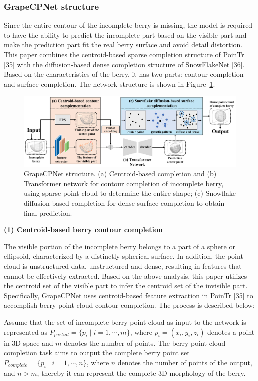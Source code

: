 \documentclass[12pt]{article}
\begin{document}
\subsubsection{GrapeCPNet structure}

Since the entire contour of the incomplete berry is missing, the model is required to have the ability to predict the incomplete part based on the visible part and make the prediction part fit the real berry surface and avoid detail distortion. 
This paper combines the centroid-based sparse completion structure of PoinTr [35] with the diffusion-based dense completion structure of SnowFlakeNet [36]. 
Based on the characteristics of the berry, it has two parts: contour completion and surface completion. The network structure is shown in Figure~\ref{fig:raw5}.

\begin{figure}[hbt!]
    \centering
    \includegraphics[width=1\textwidth]{figures/Figure10.pdf}
    \caption{GrapeCPNet structure. (a) Centroid-based completion and (b) Transformer network for contour completion of incomplete berry, using sparse point cloud to determine the entire shape; (c) Snowflake diffusion-based completion for dense surface completion to obtain final prediction.}
    \label{fig:raw5}
\end{figure}

{\raggedright\textbf{(1) Centroid-based berry contour completion}}

The visible portion of the incomplete berry belongs to a part of a sphere or ellipsoid, characterized by a distinctly spherical surface. 
In addition, the point cloud is unstructured data, unstructured and dense, resulting in features that cannot be effectively extracted. 
Based on the above analysis, this paper utilizes the centroid set of the visible part to infer the centroid set of the invisible part. 
Specifically, GrapeCPNet uses centroid-based feature extraction in PoinTr [35] to accomplish berry point cloud contour completion. The process is described below: 

Assume that the set of incomplete berry point cloud as input to the network is represented as $P_{partial}=\{p_i \mid i=1, \cdots, m \}$, where $p_i=(x_i,y_i,z_i)$ denotes a point in 3D space and $m$ denotes the number of points. 
The berry point cloud completion task aims to output the complete berry point set $P_{complete}=\{p_i \mid i=1, \cdots, n\}$, where $n$ denotes the number of points of the output, and $n > m$, thereby it can represent the complete 3D morphology of the berry.
\end{document}
